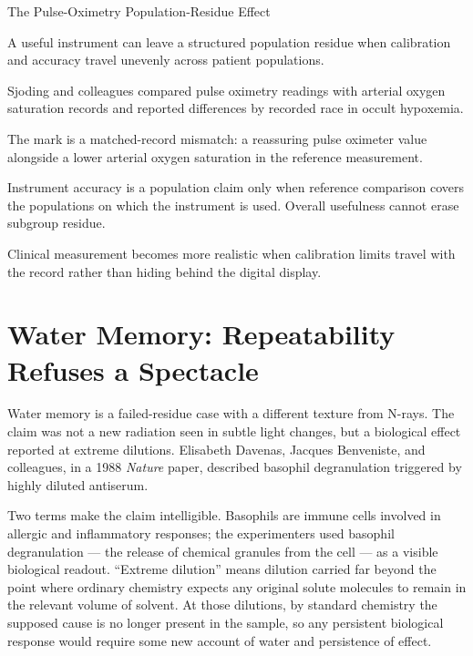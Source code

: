 \begin{phenom}{The Pulse-Oximetry Population-Residue Effect~\cite{sjoding2020}}
\label{ph:pulse-oximetry-population-residue}

\PhStatement
A useful instrument can leave a structured population residue when calibration
and accuracy travel unevenly across patient populations.

\PhOrigin
Sjoding and colleagues compared pulse oximetry readings with arterial oxygen
saturation records and reported differences by recorded race in occult
hypoxemia.

\PhObservation
The mark is a matched-record mismatch: a reassuring pulse oximeter value
alongside a lower arterial oxygen saturation in the reference measurement.

\PhConstraint
Instrument accuracy is a population claim only when reference comparison
covers the populations on which the instrument is used. Overall usefulness
cannot erase subgroup residue.

\PhConsequence
Clinical measurement becomes more realistic when calibration limits travel
with the record rather than hiding behind the digital display.
\end{phenom}

\section{Water Memory: Repeatability Refuses a Spectacle}

Water memory is a failed-residue case with a different texture from N-rays.
The claim was not a new radiation seen in subtle light changes, but a
biological effect reported at extreme dilutions. Elisabeth Davenas, Jacques
Benveniste, and colleagues, in a 1988 \emph{Nature} paper, described
basophil degranulation triggered by highly diluted antiserum.

Two terms make the claim intelligible. Basophils are immune cells involved
in allergic and inflammatory responses; the experimenters used basophil
degranulation --- the release of chemical granules from the cell --- as a
visible biological readout. ``Extreme dilution'' means dilution carried far
beyond the point where ordinary chemistry expects any original solute
molecules to remain in the relevant volume of solvent. At those dilutions,
by standard chemistry the supposed cause is no longer present in the sample,
so any persistent biological response would require some new account of
water and persistence of effect.

